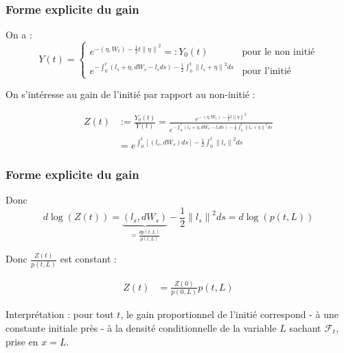 \documentclass{beamer}
\begin{document}
\begin{frame}
\frametitle{Forme explicite du gain}
\par On a :
\begin{displaymath}
Y \left( t \right) = 
\begin{cases}
e^{- \left( \eta, W_{t} \right)-\frac{1}{2} t {\| \eta \|}^{2}} =: Y_0 \left( t \right) & \text{pour le non initié} \\
e^{- \int_{0}^{t} \left( l_{s} + \eta, dW_{s} - l_s ds \right) - \frac{1}{2} \int_{0}^{t} {\| l_{s} + \eta \|}^{2} ds} & \text{pour l'initié}
\end{cases}
\end{displaymath}

\par On s'intéresse au gain de l'initié par rapport au non-initié : 

\begin{displaymath}
	\begin{split}
	Z \left( t \right) &:= \frac{Y_0 \left( t \right)}{Y \left( t \right)} = \frac{ e^{- \left( \eta, W_{t} \right)-\frac{1}{2} t {\| \eta \|}^{2}}}{e^{- \int_{0}^{t} \left( l_{s} + \eta, dW_{s} - l_s ds \right) - \frac{1}{2} \int_{0}^{t} {\| l_{s} + \eta \|}^{2} ds}} \\
	&= e^{ \int_{0}^{t} \left[ \left( l_s, dW_{s} \right) ds \right] - \frac{1}{2} \int_{0}^{t} {\| l_{s} \|}^{2} ds}
	\end{split}
\end{displaymath}
\end{frame}
 
\begin{frame}
\frametitle{Forme explicite du gain}
\par Donc
\begin{displaymath}
d \log \left( Z \left( t \right) \right) = \underbrace{\left(l_s, d W_s \right)}_{ = \frac{d p \left( t, L \right)}{p \left( t, L \right)}} - \frac{1}{2} {\| l_{s} \|}^{2} ds = d \log \left( p \left( t, L \right) \right)
\end{displaymath}

\par Donc $\frac{Z \left( t \right)}{ p \left( t, L \right) }$ est constant :

\begin{displaymath}
	\begin{split}
	Z \left( t \right) &= \frac{Z \left( 0 \right)}{ p \left( 0, L \right) } p \left( t, L \right)
	\end{split}
\end{displaymath}
\par Interprétation : pour tout $t$, le gain proportionnel de l'initié correspond - à une constante initiale près -  à la densité conditionnelle de la variable $L$ sachant $\mathcal{F}_t$, prise en $x = L$.
\end{frame}
 
\end{document}
